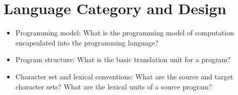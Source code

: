 \section{Language Category and Design}
\label{sect:desg}

\begin{itemize}
\item Programming model: What is the programming model of
computation encapsulated into the programming language?
\item Program structure: What is the basic translation unit for a
program?
\item Character set and lexical conventions: What are the source
and target character sets? What are the lexical units of a source
program?
\end{itemize}
